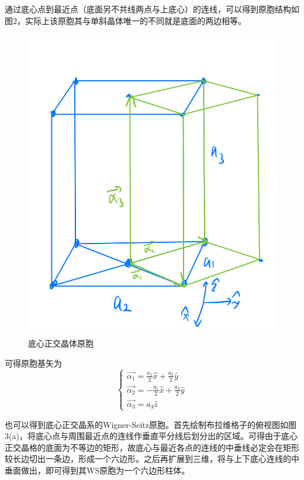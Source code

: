 \documentclass{article}
\begin{document}
	
	通过底心点到最近点（底面另不共线两点与上底心）的连线，可以得到原胞结构如图2，实际上该原胞其与单斜晶体唯一的不同就是底面的两边相等。
		\begin{figure}[!h]
		
		\centering
		\includegraphics[scale=0.2]{原胞}
		\caption{\heiti{}底心正交晶体原胞}
		
	\end{figure}
可得原胞基矢为
 \begin{equation}
 	\begin{cases}
 		\vec{\alpha_1}=\frac{a_1}{2}\hat{x}+\frac{a_2}{2}\hat{y}\\
 		\vec{\alpha_2}=-\frac{a_1}{2}\hat{x}+\frac{a_2}{2}\hat{y}\\
 		\vec{\alpha_3}=a_3\hat{z}
 	\end{cases}
 \end{equation}
	
	
	也可以得到底心正交晶系的Wigner-Seitz原胞。首先绘制布拉维格子的俯视图如图3(a)，将底心点与周围最近点的连线作垂直平分线后划分出的区域。可得由于底心正交晶格的底面为不等边的矩形，故底心与最近各点的连线的中垂线必定会在矩形较长边切出一条边，形成一个六边形。之后再扩展到三维，将与上下底心连线的中垂面做出，即可得到其WS原胞为一个六边形柱体。
\end{document}
